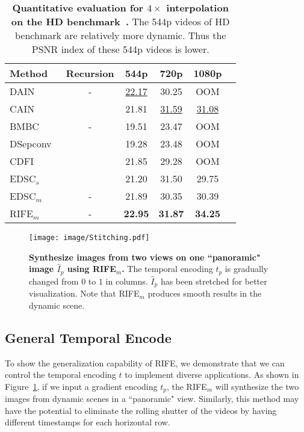 \documentclass[final]{cvpr}
\def\red#1{\textcolor{MyRed}{#1}}
\def\blue#1{\textcolor{MyBlue}{#1}}
\def\first#1{\red{\textbf{#1}}}
\def\second#1{\blue{\underline{#1}}}
\begin{document}
\begin{table}[t]
	
	\caption{\textbf{Quantitative evaluation for $4\times$ interpolation on the HD benchmark~\cite{bao2019memc}. } The 544p videos of HD benchmark are relatively more dynamic. Thus the PSNR index of these 544p videos is lower.}\label{tab:hd8}
	\centering
	\small
	\begin{tabular}{lccccc}
		\hline
		Method & Recursion & 544p & 720p & 1080p\\ \hline
		DAIN~\cite{bao2019depth} & -& \second{22.17} & 30.25 & OOM \\
		CAIN~\cite{choi2020channel} & \checkmark & 21.81 & \second{31.59} & \second{31.08}  \\
		BMBC~\cite{park2020bmbc} & - & 19.51 & 23.47 & OOM 
		\\ 
		DSepconv~\cite{cheng2020video} & \checkmark & 19.28 & 23.48 & OOM\\
		CDFI~\cite{ding2021cdfi} & \checkmark & 21.85 & 29.28 & OOM \\
		EDSC$_s$~\cite{cheng2020multiple} & \checkmark & 21.20 & 31.50 & 29.75\\
		EDSC$_m$~\cite{cheng2020multiple} & - & 21.89 & 30.35 & 30.39 \\
		\hline
		RIFE$_m$ & - & \first{22.95} & \first{31.87} & \first{34.25} \\ \hline
	\end{tabular}
	\normalsize


\end{table}

\begin{figure}[t]
	\centering
	\texttt{[image: image/Stitching.pdf]}
	\caption{\textbf{Synthesize images from two views on one ``panoramic" image $\widehat{I}_p$ using RIFE$_m$.} The temporal encoding $t_p$ is gradually changed from $0$ to $1$ in columns. $\widehat{I}_p$ has been stretched for better visualization. Note that RIFE$_m$ produces smooth results in the dynamic scene.}\label{fig:Stitching}
\end{figure}

\subsection{General Temporal Encode}
To show the generalization capability of RIFE, we demonstrate that we can control the temporal encoding $t$ to implement diverse applications. As shown in Figure~\ref{fig:Stitching}, if we input a gradient encoding $t_p$, the RIFE$_m$ will synthesize the two images from dynamic scenes in a ``panoramic" view. Similarly, this method may have the potential to eliminate the rolling shutter of the videos by having different timestamps for each horizontal row.
\end{document}

